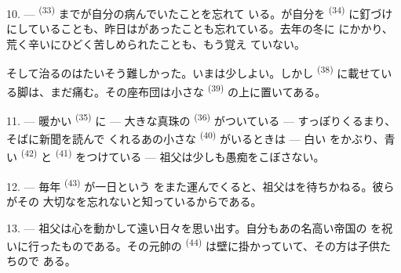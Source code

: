 \VUsaut{4.2mm}
\VUsaut{3.0mm}

10. ---  \textsuperscript{(33)} までが自分の病んでいたことを忘れて
いる。が自分を \textsuperscript{(34)} に釘づけ
にしていることも、昨日はがあったことも忘れている。去年の冬に
にかかり、荒く辛いにひどく苦しめられたことも、もう覚え
ていない。

そして治るのはたいそう難しかった。いまは少しよい。しかし
\textsuperscript{(38)} に載せている脚は、まだ痛む。その座布団は小さな
\textsuperscript{(39)} の上に置いてある。

11. --- 暖かい \textsuperscript{(35)} に --- 大きな真珠の
 \textsuperscript{(36)} がついている --- すっぽりくるまり、そばに新聞を読んで
くれるあの小さな \textsuperscript{(40)} がいるときは --- 白い
をかぶり、青い \textsuperscript{(42)} と
\textsuperscript{(41)} をつけている --- 祖父は少しも愚痴をこぼさない。

12. --- 毎年 \textsuperscript{(43)} が一日という
をまた運んでくると、祖父はを待ちかねる。彼らがその
大切なを忘れないと知っているからである。

13. --- 祖父は心を動かして遠い日々を思い出す。自分もあの名高い帝国の
を祝いに行ったものである。その元帥の
\textsuperscript{(44)} は壁に掛かっていて、その方は子供たちので
ある。
\VUsaut{6.0mm}
\VUfilet{22mm}
